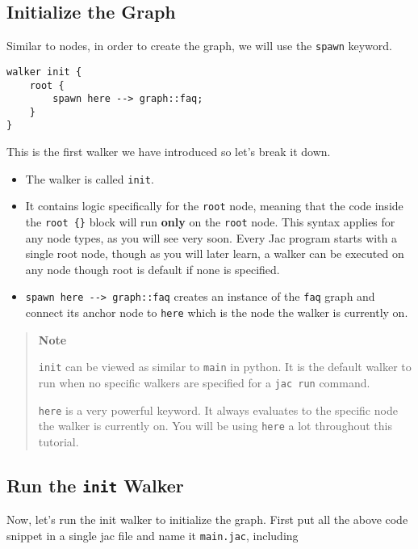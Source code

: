 \subsection{Initialize the Graph}\label{initialize-the-graph}

Similar to nodes, in order to create the graph, we will use the
\lstinline!spawn! keyword.

\begin{lstlisting}
walker init {
    root {
        spawn here --> graph::faq;
    }
}
\end{lstlisting}

This is the first walker we have introduced so let's break it down.

\begin{itemize}
\tightlist
\item
  The walker is called \lstinline!init!.
\item
  It contains logic specifically for the \lstinline!root! node, meaning
  that the code inside the \lstinline!root {}! block will run
  \textbf{only} on the \lstinline!root! node. This syntax applies for
  any node types, as you will see very soon. Every Jac program starts
  with a single root node, though as you will later learn, a walker can
  be executed on any node though root is default if none is specified.
\item
  \lstinline!spawn here --> graph::faq! creates an instance of the
  \lstinline!faq! graph and connect its anchor node to \lstinline!here!
  which is the node the walker is currently on.
\end{itemize}

\begin{quote}
\textbf{Note}

\lstinline!init! can be viewed as similar to \lstinline!main! in python.
It is the default walker to run when no specific walkers are specified
for a \lstinline!jac run! command.

\lstinline!here! is a very powerful keyword. It always evaluates to the
specific node the walker is currently on. You will be using
\lstinline!here! a lot throughout this tutorial.
\end{quote}

\subsection{\texorpdfstring{Run the \texttt{init}
Walker}{Run the init Walker}}\label{run-the-init-walker}

Now, let's run the init walker to initialize the graph. First put all
the above code snippet in a single jac file and name it
\lstinline!main.jac!, including

